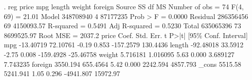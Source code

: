 . reg price mpg length weight foreign
{\smallskip}
      Source {\VBAR}       SS           df       MS      Number of obs   =        74
   F(4, 69)        =     21.01
       Model {\VBAR}   348708940         4    87177235   Prob > F        =    0.0000
    Residual {\VBAR}   286356456        69  4150093.57   R-squared       =    0.5491
   Adj R-squared   =    0.5230
       Total {\VBAR}   635065396        73  8699525.97   Root MSE        =    2037.2
{\smallskip}
       price {\VBAR}      Coef.   Std. Err.      t    P>|t|     [95\% Conf. Interval]
         mpg {\VBAR}  -13.40719   72.10761    -0.19   0.853    -157.2579    130.4436
      length {\VBAR}  -92.48018    33.5912    -2.75   0.008    -159.4928   -25.46758
      weight {\VBAR}   5.716181   1.016095     5.63   0.000     3.689127    7.743235
     foreign {\VBAR}   3550.194   655.4564     5.42   0.000     2242.594    4857.793
       _cons {\VBAR}    5515.58   5241.941     1.05   0.296    -4941.807    15972.97
{\smallskip}
